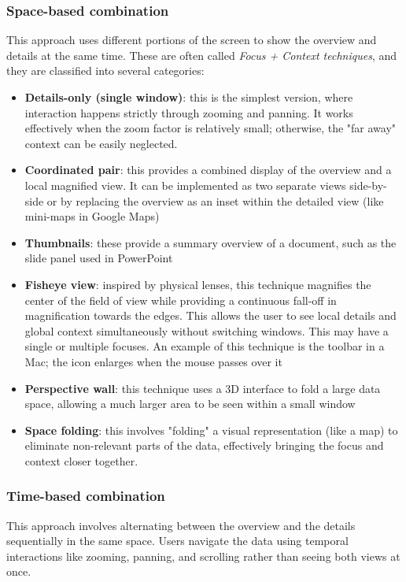 \subsubsection{Space-based combination}
This approach uses different portions of the screen to show the overview and details at the same time. These are often called \textit{Focus + Context techniques}, and they are classified into several categories:
\begin{itemize}[noitemsep]
    \item \textbf{Details-only (single window)}: this is the simplest version, where interaction happens strictly through zooming and panning. It works effectively when the zoom factor is relatively small; otherwise, the "far away" context can be easily neglected.
    \item \textbf{Coordinated pair}: this provides a combined display of the overview and a local magnified view. It can be implemented as two separate views side-by-side or by replacing the overview as an inset within the detailed view (like mini-maps in Google Maps)
    \item \textbf{Thumbnails}: these provide a summary overview of a document, such as the slide panel used in PowerPoint 
    \item \textbf{Fisheye view}: inspired by physical lenses, this technique magnifies the center of the field of view while providing a continuous fall-off in magnification towards the edges. This allows the user to see local details and global context simultaneously without switching windows. This may have a single or multiple focuses. An example of this technique is the toolbar in a Mac; the icon enlarges when the mouse passes over it
    \item \textbf{Perspective wall}: this technique uses a 3D interface to fold a large data space, allowing a much larger area to be seen within a small window
    \item \textbf{Space folding}: this involves "folding" a visual representation (like a map) to eliminate non-relevant parts of the data, effectively bringing the focus and context closer together.
\end{itemize}

\subsubsection{Time-based combination}
This approach involves alternating between the overview and the details sequentially in the same space. Users navigate the data using temporal interactions like zooming, panning, and scrolling rather than seeing both views at once.

